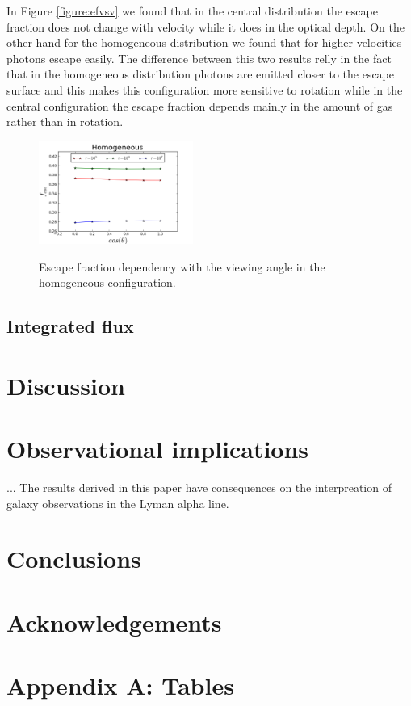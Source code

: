 \documentclass[usenatbib]{mn2e}
\begin{document}
In Figure \ref{figure:efvsv} we found that in the central distribution the escape fraction does not change with velocity while it
does in the optical depth. On the other hand for the homogeneous distribution
we found that for higher velocities photons escape easily. The
difference between this two results relly in the fact that in the
homogeneous distribution photons are emitted closer to the escape
surface and this makes this configuration more sensitive to
rotation while in the central configuration the escape fraction depends mainly in the amount of gas rather than in rotation.    

\begin{figure}
  \includegraphics[width=0.45\textwidth]{FEHomogeneousvsThetaL.png}
 \label{figure:efvstheta}\caption{Escape fraction dependency with the viewing angle in the homogeneous configuration.} 
\end{figure}

\subsection{Integrated flux}


\section{Discussion}
\label{sec:discussion}

\section{Observational implications}

... The results derived in this paper have consequences on the
interpreation of galaxy observations in the Lyman alpha line.

\section{Conclusions}

\section*{Acknowledgements}

\section*{Appendix A: Tables}
\end{document}
